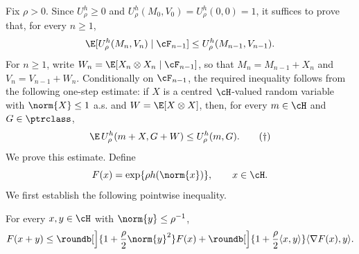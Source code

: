 \documentclass[11pt]{article}
\begin{document}
Fix $\rho>0$. Since $U_\rho^h\ge0$ and $U_\rho^h(M_0,V_0)=U_\rho^h(0,0)=1$, it suffices to prove that, for every $n\ge1$,
\[
  \E[U_\rho^h(M_n,V_n)\mid\cF_{n-1}]
  \le
  U_\rho^h(M_{n-1},V_{n-1}).
\]
For $n\ge1$, write $W_n=\E[X_n\otimes X_n\mid\cF_{n-1}]$, so that $M_n=M_{n-1}+X_n$ and $V_n=V_{n-1}+W_n$. Conditionally on $\cF_{n-1}$, the required inequality follows from the following one-step estimate: if $X$ is a centred $\cH$-valued random variable with $\norm{X}\le1$ a.s. and $W=\E[X\otimes X]$, then, for every $m\in\cH$ and $G\in\ptrclass$,
\begin{equation}\label{eq:one-step}
  \E\,U_\rho^h(m+X,G+W)\le U_\rho^h(m,G).\tag{$\dagger$}
\end{equation}
We prove this estimate. Define
\[
  F(x)=\exp\{\rho h(\norm{x})\},\qquad x\in\cH.
\]
We first establish the following pointwise inequality.

\begin{lemma}[restate=bennettTangent,name=]\label{lem:bennett-tangent}
For every $x,y\in\cH$ with $\norm{y}\le\rho^{-1}$,
\[
  F(x+y)
  \le
  \roundb[\Big]{1+\frac{\rho}{2}\norm{y}^2} F(x)
  +
  \roundb[\Big]{1+\frac{\rho}{2}\langle x,y\rangle} \langle \nabla F(x),y\rangle.
\]
\end{lemma}
\end{document}
